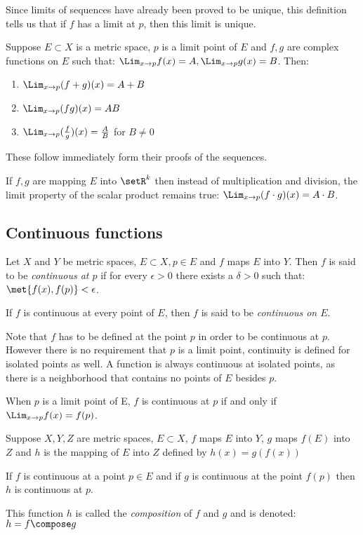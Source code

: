\documentclass[12pt, letterpaper]{paper}
\begin{document}
Since limits of sequences have already been proved to be unique, this
definition tells us that if $f$ has a limit at $p$, then this limit is
unique.

\begin{theorem}
  \label{thr:4.4}
  Suppose $E \subset X$ is a metric space, $p$ is a limit point of $E$
  and $f,g$ are complex functions on $E$ such that:
  $\Lim_{x\to p} f(x) = A, \Lim_{x\to p}g(x) = B$. Then:
  \begin{enumerate}
  \item $\Lim_{x\to p}(f+g)(x) = A + B$
  \item $\Lim_{x\to p}(fg)(x) = AB$
  \item $\Lim_{x\to p}(\frac{f}{g})(x) = \frac{A}{B}$ for $B \neq 0$
  \end{enumerate}
\end{theorem}
These follow immediately form their proofs of the sequences.

If $f,g$ are mapping $E$ into $\setR^k$ then instead of multiplication
and division, the limit property of the scalar product remains true:
\newline $\Lim_{x\to p}(f \cdot g)(x) = A\cdot B$.


\subsection{Continuous functions}
Let $X$ and $Y$ be metric spaces, $E \subset X, p \in E$ and $f$ maps
$E$ into $Y$. Then $f$ is said to be \emph{continuous at $p$} if for
every $\epsilon > 0 $ there exists a $\delta > 0$ such that:
$\met{f(x),f(p)} < \epsilon$.

If $f$ is continuous at every point of $E$, then $f$ is said to be
\emph{continuous on $E$}.

Note that $f$ has to be defined at the point $p$ in order to be
continuous at $p$. However there is no requirement that $p$ is a limit
point, continuity is defined for isolated points as well. A function
is always continuous at isolated points, as there is a neighborhood
that contains no points of $E$ besides $p$.

\begin{theorem}
  \label{thr:4.6}
  When $p$ is a limit point of E, $f$ is continuous at $p$ if and only
  if $\Lim_{x \to p}f(x) = f(p)$.
\end{theorem}

\begin{theorem}
  \label{thr:4.7}
  Suppose $X,Y,Z$ are metric spaces, $E \subset X$, $f$ maps $E$ into
  $Y$, $g$ maps $f(E)$ into $Z$ and $h$ is the mapping of $E$ into $Z$
  defined by $h(x) = g(f(x))$

  If $f$ is continuous at a point $p \in E$ and if $g$ is continuous
  at the point $f(p)$ then $h$ is continuous at $p$.

  This function $h$ is called the \emph{composition} of $f$ and $g$
  and is denoted: $h = f \compose g$
\end{theorem}
\end{document}
